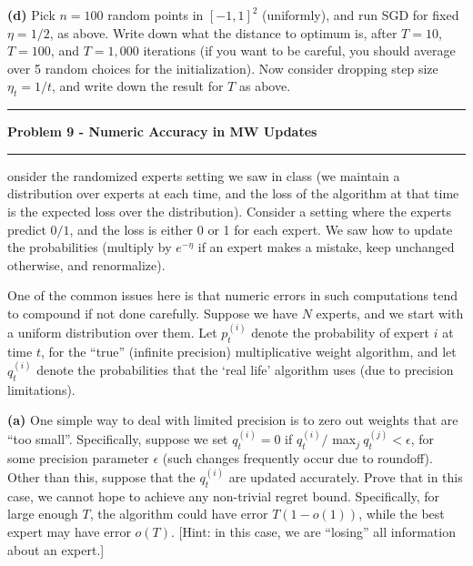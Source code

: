 \documentclass[11pt]{article}
\newcommand\question[2]{\vspace{.25in}\hrule\textbf{#1}\vspace{.5em}\hrule\vspace{.10in}}
\renewcommand\part[1]{\vspace{.10in}\textbf{(#1)}}
\begin{document}

\part{d} Pick $n = 100$ random points in $[-1, 1]^2$ (uniformly), and run SGD for fixed $\eta = 1/2$, as above. Write down what the distance to optimum is, after $T = 10$, $T = 100$, and $T = 1,000$ iterations (if you want to be careful, you should average over 5 random choices for the initialization). Now consider dropping step size $\eta_t = 1/t$, and write down the result for $T$ as above.


\question{Problem 9 - Numeric Accuracy in MW Updates}

Consider the randomized experts setting we saw in class (we maintain a distribution over experts at each time, and the loss of the algorithm at that time is the expected loss over the distribution). Consider a setting where the experts predict $0/1$, and the loss is either 0 or 1 for each expert. We saw how to update the probabilities (multiply by $e^{-\eta}$ if an expert makes a mistake, keep unchanged otherwise, and renormalize).

One of the common issues here is that numeric errors in such computations tend to compound if not done carefully. Suppose we have $N$ experts, and we start with a uniform distribution over them. Let $p_t^{(i)}$ denote the probability of expert $i$ at time $t$, for the ``true'' (infinite precision) multiplicative weight algorithm, and let $q_t^{(i)}$ denote the probabilities that the `real life' algorithm uses (due to precision limitations).

\part{a} One simple way to deal with limited precision is to zero out weights that are ``too small''. Specifically, suppose we set $q_t^{(i)} = 0$ if $q_t^{(i)} /$ max$_j \ q_t^{(j)} < \epsilon$, for some precision parameter $\epsilon$ (such changes frequently occur due to roundoff). Other than this, suppose that the $q_t^{(i)}$ are updated accurately. Prove that in this case, we cannot hope to achieve any non-trivial regret bound. Specifically, for large enough $T$, the algorithm could have error $T(1 - o(1))$, while the best expert may have error $o(T)$. [Hint: in this case, we are ``losing'' all information about an expert.]
\end{document}
